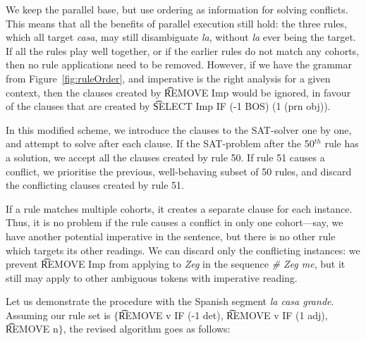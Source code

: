We keep the parallel base, but use ordering as information for solving conflicts.
This means that all the benefits of parallel execution still hold: the three rules, which all target \emph{casa}, may still disambiguate \emph{la}, without \emph{la} ever being the target.
If all the rules play well together, or if the earlier rules do not match any cohorts,
then no rule applications need to be removed.
However, if we have the grammar from Figure~\ref{fig:ruleOrder},
and imperative is the right analysis for a given context, then the clauses created by
\t{REMOVE Imp} would be ignored, in favour of the clauses that are created
by \t{SELECT Imp IF (-1 BOS) (1 (prn obj))}.




In this modified scheme, we introduce the clauses to the SAT-solver one by one,
and attempt to solve after each clause. If the SAT-problem after the 50$^{th}$ rule
has a solution, we accept all the clauses created by rule 50. %
If rule 51 causes a conflict, we prioritise the previous, well-behaving subset of
50 rules, and discard the conflicting clauses created by rule 51.

If a rule matches multiple cohorts, it creates a separate clause for each instance.
Thus, it is no problem if the rule causes a conflict in only one cohort---say, we
have another potential imperative in the sentence,
but there is no other rule which targets its other readings.
We can discard only the conflicting instances: we prevent
\t{REMOVE Imp} from applying to \emph{Zeg} in the sequence \emph{\# Zeg me},
but it still may apply to other ambiguous tokens with imperative reading.


Let us demonstrate the procedure with the Spanish segment {\em la casa grande}.
Assuming our rule set is $\{$\t{REMOVE v IF (-1 det)}, \t{REMOVE v IF (1 adj)}, \t{REMOVE n}$\}$, the revised algorithm goes as follows:


